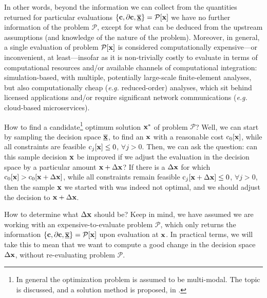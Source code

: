 \documentclass[11pt]{article}
\begin{document}
In other words, beyond the information we can collect from the quantities returned for particular evaluations $\left\{\mathbf{c}, \partial \mathbf{c}, \underline{\overline{\mathbf{x}}}\right\}=\mathcal{P}[\mathbf{x}]$ we have no further information of the problem $\mathcal{P}$, except for what can be deduced from the upstream assumptions (and knowledge of the nature of the problem). Moreover, in general, a single evaluation of problem $\mathcal{P}[\mathbf{x}]$ is considered computationally expensive---or inconvenient, at least---insofar as it is non-trivially costly to evaluate in terms of computational resources and/or available channels of computational integration:  simulation-based, with multiple, potentially large-scale finite-element analyses, but also computationally cheap (\emph{e.g.} reduced-order) analyses, which sit behind licensed applications and/or require significant network communications (\emph{e.g.} cloud-based microservices).

How to find a candidate\footnote{In general the optimization problem is assumed to be multi-modal. The topic is discussed, and a solution method is proposed, in \cite{munro2022}.} optimum solution $\mathbf{x}^\ast$ of problem $\mathcal{P}$?  Well, we can start by sampling the decision space $\underline{\overline{\mathbf{x}}}$, to find an $\mathbf{x}$ with a reasonable cost $\textrm{c}_0 [\mathbf{x}]$, while all constraints are feasible $\textrm{c}_j [\mathbf{x}] \leq 0$, $\forall j > 0$. Then, we can ask the question: can this sample decision $\mathbf{x}$ be improved if we adjust the evaluation in the decision space by a particular amount $\mathbf{x} + \Delta \mathbf{x}$? If there is a $\Delta \mathbf{x}$ for which $\textrm{c}_0 [\mathbf{x}] > \textrm{c}_0 [\mathbf{x} + \Delta\mathbf{x}]$, while all constraints remain feasible $\textrm{c}_j [\mathbf{x} + \Delta \mathbf{x}] \leq 0$, $\forall j > 0$, then the sample $\mathbf{x}$ we started with was indeed not optimal, and we should adjust the decision to $\mathbf{x} + \Delta \mathbf{x}$.

How to determine what $\Delta \mathbf{x}$ should be? Keep in mind, we have assumed we are working with an expensive-to-evaluate problem $\mathcal{P}$, which only returns the information $\left\{\mathbf{c}, \partial \mathbf{c}, \underline{\overline{\mathbf{x}}}\right\}=\mathcal{P}[\mathbf{x}]$ upon evaluation at $\mathbf{x}$. In practical terms, we will take this to mean that we want to compute a good change in the decision space $\Delta \mathbf{x}$, without re-evaluating problem $\mathcal{P}$.
\end{document}
